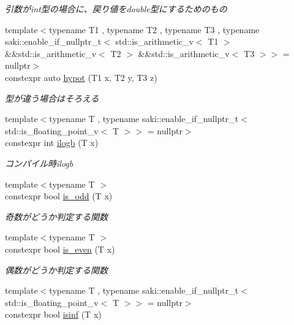 \begin{DoxyCompactItemize}
\begin{DoxyCompactList}\small\item\em 引数がint型の場合に、戻り値をdouble型にするためのもの \end{DoxyCompactList}\item 
{\footnotesize template$<$typename T1 , typename T2 , typename T3 , typename saki\+::enable\+\_\+if\+\_\+nullptr\+\_\+t$<$ std\+::is\+\_\+arithmetic\+\_\+v$<$ T1 $>$ \&\&std\+::is\+\_\+arithmetic\+\_\+v$<$ T2 $>$ \&\&std\+::is\+\_\+arithmetic\+\_\+v$<$ T3 $>$$>$  = nullptr$>$ }\\constexpr auto \mbox{\hyperlink{namespacesaki_a210e4f63ae8c3ff62e53396f8ba45d91}{hypot}} (T1 x, T2 y, T3 z)
\begin{DoxyCompactList}\small\item\em 型が違う場合はそろえる \end{DoxyCompactList}\item 
{\footnotesize template$<$typename T , typename saki\+::enable\+\_\+if\+\_\+nullptr\+\_\+t$<$ std\+::is\+\_\+floating\+\_\+point\+\_\+v$<$ T $>$$>$  = nullptr$>$ }\\constexpr int \mbox{\hyperlink{namespacesaki_a582e9de82aa8572287c01530ae2626a8}{ilogb}} (T x)
\begin{DoxyCompactList}\small\item\em コンパイル時ilogb \end{DoxyCompactList}\item 
{\footnotesize template$<$typename T $>$ }\\constexpr bool \mbox{\hyperlink{namespacesaki_a03cf21b9e2231e956f8da966f1e09d70}{is\+\_\+odd}} (T x)
\begin{DoxyCompactList}\small\item\em 奇数がどうか判定する関数 \end{DoxyCompactList}\item 
{\footnotesize template$<$typename T $>$ }\\constexpr bool \mbox{\hyperlink{namespacesaki_a7fa7e4ec89e948874e42926e91d6dd4e}{is\+\_\+even}} (T x)
\begin{DoxyCompactList}\small\item\em 偶数がどうか判定する関数 \end{DoxyCompactList}\item 
{\footnotesize template$<$typename T , typename saki\+::enable\+\_\+if\+\_\+nullptr\+\_\+t$<$ std\+::is\+\_\+floating\+\_\+point\+\_\+v$<$ T $>$$>$  = nullptr$>$ }\\constexpr bool \mbox{\hyperlink{namespacesaki_a2168418bb30a857d2d018d0d05c7ace0}{isinf}} (T x)

\end{DoxyCompactItemize}

